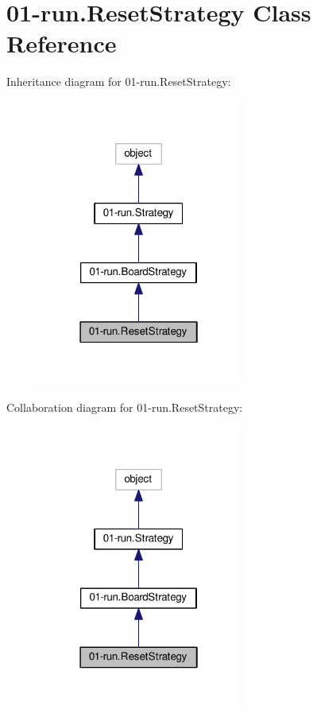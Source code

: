 \hypertarget{class01-run_1_1ResetStrategy}{}\section{01-\/run.Reset\+Strategy Class Reference}
\label{class01-run_1_1ResetStrategy}


Inheritance diagram for 01-\/run.Reset\+Strategy\+:
\nopagebreak
\begin{figure}[H]
\begin{center}
\leavevmode
\includegraphics[width=190pt]{class01-run_1_1ResetStrategy__inherit__graph}
\end{center}
\end{figure}


Collaboration diagram for 01-\/run.Reset\+Strategy\+:
\nopagebreak
\begin{figure}[H]
\begin{center}
\leavevmode
\includegraphics[width=190pt]{class01-run_1_1ResetStrategy__coll__graph}
\end{center}
\end{figure}
